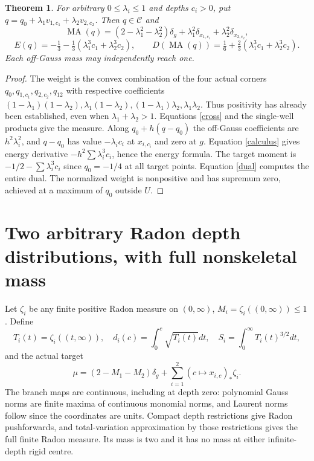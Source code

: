 \documentclass[11pt]{article}
\newtheorem{theorem}{Theorem}
\newcommand{\MA}{\operatorname{MA}}
\newcommand{\C}{\mathcal C}
\begin{document}
\begin{theorem}\label{independent}
For arbitrary $0\le\lambda_i\le1$ and depths $c_i>0$, put
$q=q_0+\lambda_1v_{1,c_1}+\lambda_2v_{2,c_2}$. Then $q\in\C$ and
\[
 \MA(q)=(2-\lambda_1^2-\lambda_2^2)\delta_g
        +\lambda_1^2\delta_{x_{1,c_1}}+\lambda_2^2\delta_{x_{2,c_2}},
\]
\[
 E(q)=-\tfrac13-\tfrac13(\lambda_1^3c_1+\lambda_2^3c_2),\qquad
 D(\MA(q))=\tfrac16+\tfrac23(\lambda_1^3c_1+\lambda_2^3c_2).
\]
Each off-Gauss mass may independently reach one.
\end{theorem}
\begin{proof}
The weight is the convex combination of the four actual corners
$q_0,q_{1,c_1},q_{2,c_2},q_{12}$ with respective coefficients
$(1-\lambda_1)(1-\lambda_2),\lambda_1(1-\lambda_2),
(1-\lambda_1)\lambda_2,\lambda_1\lambda_2$. Thus positivity has
already been established, even when $\lambda_1+\lambda_2>1$.
Equations \eqref{cross} and the single-well products give the measure.
Along $q_0+h(q-q_0)$ the off-Gauss coefficients are $h^2\lambda_i^2$,
and $q-q_0$ has value $-\lambda_ic_i$ at $x_{i,c_i}$ and zero at $g$.
Equation \eqref{calculus} gives energy derivative
$-h^2\sum\lambda_i^3c_i$, hence the energy formula.
The target moment is $-1/2-\sum\lambda_i^3c_i$ since $q_0=-1/4$
at all target points. Equation \eqref{dual} computes the entire dual.
The normalized weight is nonpositive and has supremum zero, achieved at
a maximum of $q_0$ outside $U$.
\end{proof}

\section*{Two arbitrary Radon depth distributions, with full nonskeletal mass}
Let $\zeta_i$ be any finite positive Radon measure on $(0,\infty)$,
$M_i=\zeta_i((0,\infty))\le1$. Define
\[
 T_i(t)=\zeta_i((t,\infty)),\quad
 d_i(c)=\int_0^c\sqrt{T_i(t)}dt,\quad
 S_i=\int_0^\infty T_i(t)^{3/2}dt,
\]
and the actual target
\[
 \mu=(2-M_1-M_2)\delta_g+\sum_{i=1}^2(c\mapsto x_{i,c})_*\zeta_i.
\]
The branch maps are continuous, including at depth zero: polynomial Gauss
norms are finite maxima of continuous monomial norms, and Laurent norms
follow since the coordinates are units. Compact depth restrictions give
Radon pushforwards, and total-variation approximation by those restrictions
gives the full finite Radon measure. Its mass is two and it has no mass
at either infinite-depth rigid centre.
\end{document}

